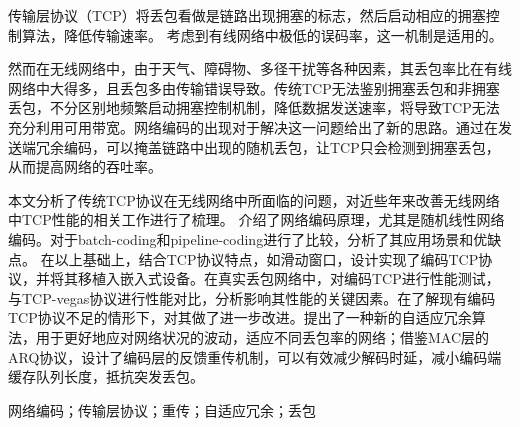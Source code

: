 \cabstract
{
	\par
	传输层协议（TCP）将丢包看做是链路出现拥塞的标志，然后启动相应的拥塞控制算法，降低传输速率。
	考虑到有线网络中极低的误码率，这一机制是适用的。
	\par
	然而在无线网络中，由于天气、障碍物、多径干扰等各种因素，其丢包率比在有线网络中大得多，且丢包多由传输错误导致。传统TCP无法鉴别拥塞丢包和非拥塞丢包，不分区别地频繁启动拥塞控制机制，降低数据发送速率，将导致TCP无法充分利用可用带宽。网络编码的出现对于解决这一问题给出了新的思路。通过在发送端冗余编码，可以掩盖链路中出现的随机丢包，让TCP只会检测到拥塞丢包，从而提高网络的吞吐率。
	\par
	本文分析了传统TCP协议在无线网络中所面临的问题，对近些年来改善无线网络中TCP性能的相关工作进行了梳理。
	介绍了网络编码原理，尤其是随机线性网络编码。对于batch-coding和pipeline-coding进行了比较，分析了其应用场景和优缺点。
	在以上基础上，结合TCP协议特点，如滑动窗口，设计实现了编码TCP协议，并将其移植入嵌入式设备。在真实丢包网络中，对编码TCP进行性能测试，与TCP-vegas协议进行性能对比，分析影响其性能的关键因素。在了解现有编码TCP协议不足的情形下，对其做了进一步改进。提出了一种新的自适应冗余算法，用于更好地应对网络状况的波动，适应不同丢包率的网络；借鉴MAC层的ARQ协议，设计了编码层的反馈重传机制，可以有效减少解码时延，减小编码端缓存队列长度，抵抗突发丢包。
	\par
	
}
{网络编码；传输层协议；重传；自适应冗余；丢包} 	%